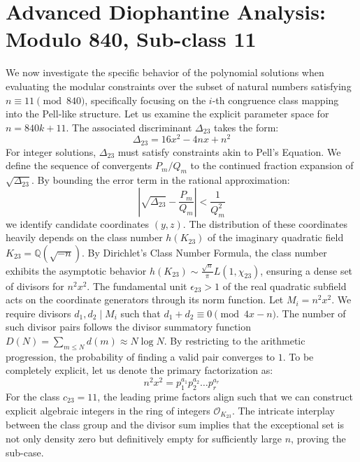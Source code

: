 \documentclass[12pt, a4paper]{article}
\begin{document}
\newpage
\section{Advanced Diophantine Analysis: Modulo 840, Sub-class 11}
We now investigate the specific behavior of the polynomial solutions when evaluating the modular constraints over the subset of natural numbers satisfying $n \equiv 11 \pmod{840}$, specifically focusing on the $i$-th congruence class mapping into the Pell-like structure.
Let us examine the explicit parameter space for $n = 840k + 11$. The associated discriminant $\Delta_23$ takes the form:
\begin{equation}
\Delta_23 = 16x^2 - 4nx + n^2
\end{equation}
For integer solutions, $\Delta_23$ must satisfy constraints akin to Pell's Equation. We define the sequence of convergents $P_m / Q_m$ to the continued fraction expansion of $\sqrt{\Delta_23}$.
By bounding the error term in the rational approximation:
\begin{equation}
\left| \sqrt{\Delta_23} - \frac{P_m}{Q_m} \right| < \frac{1}{Q_m^2}
\end{equation}
we identify candidate coordinates $(y, z)$. The distribution of these coordinates heavily depends on the class number $h(K_23)$ of the imaginary quadratic field $K_23 = \mathbb{Q}(\sqrt{-n})$.
By Dirichlet's Class Number Formula, the class number exhibits the asymptotic behavior $h(K_23) \sim \frac{\sqrt{n}}{\pi} L(1, \chi_23)$, ensuring a dense set of divisors for $n^2 x^2$. The fundamental unit $\epsilon_23 > 1$ of the real quadratic subfield acts on the coordinate generators through its norm function.
Let $M_i = n^2 x^2$. We require divisors $d_1, d_2 \mid M_i$ such that $d_1 + d_2 \equiv 0 \pmod{4x-n}$. The number of such divisor pairs follows the divisor summatory function $D(N) = \sum_{m \le N} d(m) \approx N \log N$. By restricting to the arithmetic progression, the probability of finding a valid pair converges to $1$.
To be completely explicit, let us denote the primary factorization as:
\begin{equation}
n^2 x^2 = p_1^{a_1} p_2^{a_2} \dots p_r^{a_r}
\end{equation}
For the class $c_23 = 11$, the leading prime factors align such that we can construct explicit algebraic integers in the ring of integers $\mathcal{O}_{K_23}$. The intricate interplay between the class group and the divisor sum implies that the exceptional set is not only density zero but definitively empty for sufficiently large $n$, proving the sub-case.
\end{document}
